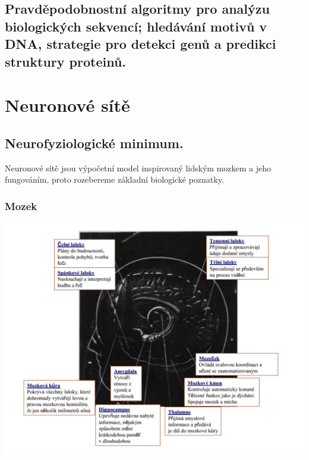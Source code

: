 \documentclass[11pt]{report} %
\begin{document}
\section{Pravděpodobnostní algoritmy pro analýzu biologických sekvencí; hledávání motivů v DNA, strategie pro detekci genů a predikci struktury proteinů.}


\chapter{Neuronové sítě}
\section{Neurofyziologické minimum.}
Neuronové sítě jsou výpočetní model inspirovaný lidským mozkem a jeho fungováním, proto rozebereme základní biologické poznatky.

\subsection{Mozek}

\includegraphics[width=\textwidth]{img/mozek.png}
\end{document}
